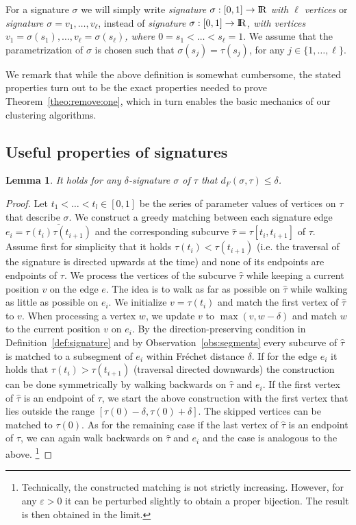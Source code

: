 \documentclass[11pt, letter]{article}
\newtheorem{lemma}[theorem]{Lemma}
\newcommand{\seclab}[1]{\label{sec:#1}}
\newcommand{\thmref}[1]{Theorem~\ref{theo:#1}}
\newcommand{\lemlab}[1]{\label{lemma:#1}}
\newcommand{\defref}[1]{Definition~\ref{def:#1}}
\newcommand{\obsref}[1]{Observation~\ref{obs:#1}}
\newcommand{\Frechet}{Fr\'echet\xspace}
\providecommand{\eps}{{\varepsilon}}\newcommand{\Astop}{\overline{a}}
\providecommand{\pth}[2][\!]{#1\left({#2}\right)}
\renewcommand{\Re}{{\rm I\!\hspace{-0.025em} R}}
\newcommand{\lenClusters}{\ensuremath{\ell}}
\newcommand{\distFr}[2]{\ensuremath{d_F\pth{#1,#2}}}
\begin{document}
For a signature $\sigma$ we will simply write \emph{signature $\sigma:[0,1]\rightarrow\Re$ with $\lenClusters$ vertices} or \emph{signature $\sigma=v_1,\ldots,v_\lenClusters$}, instead of \emph{signature $\sigma:[0,1]\rightarrow\Re$, with vertices $v_1=\sigma(s_1),\ldots,v_\lenClusters=\sigma(s_\lenClusters)$, where $0=s_1<\ldots<s_\lenClusters=1$}. We assume that the parametrization of $\sigma$ is chosen such that $\sigma(s_j)=\tau(s_j)$, for any $j\in\lbrace 1,\ldots,\lenClusters\rbrace$.

We remark that while the above definition is somewhat cumbersome, the stated
properties turn out to be the exact properties needed to prove
\thmref{remove:one}, which in turn enables the basic mechanics of our clustering
algorithms.

\subsection{Useful properties of signatures}
\seclab{properties:signatures}

\begin{lemma}\lemlab{fd:signature}
It holds for any $\delta$-signature $\sigma$ of $\tau$ that $\distFr{\sigma}{\tau}\leq \delta$.
\end{lemma}


\begin{proof}
Let $t_1<\dots<t_l \in [0,1]$ be the series of parameter values of vertices on $\tau$ that describe $\sigma$. We construct a greedy matching between each signature edge $e_i=\overline{\tau(t_i)\tau(t_{i+1})}$ and the corresponding subcurve $\widehat{\tau}=\tau[t_i,t_{i+1}]$ of $\tau$. Assume first for simplicity that it holds $\tau(t_i)<\tau(t_{i+1})$ (i.e. the traversal of the signature is directed upwards at the time) and none of its endpoints are endpoints of $\tau$. We process the vertices of the subcurve $\widehat{\tau}$ while keeping a current position $v$ on the edge $e$. The idea is to walk as far as possible on $\widehat{\tau}$ while walking as little as possible on $e_i$. We initialize $v=\tau(t_i)$ and match the first vertex of $\widehat{\tau}$ to $v$. When processing a vertex $w$, we update $v$ to $\max(v,w-\delta)$ and match $w$ to the current position $v$ on $e_i$. By the direction-preserving condition in \defref{signature} and by \obsref{segments} every subcurve of $\widehat{\tau}$ is matched to a subsegment of $e_i$ within \Frechet distance $\delta$. If for the edge $e_i$ it holds that $\tau(t_i)>\tau(t_{i+1})$ (traversal directed downwards) the construction can be done symmetrically by walking backwards on $\widehat{\tau}$ and $e_i$. If the first vertex of $\widehat{\tau}$ is an endpoint of $\tau$, we start the above construction with the first vertex that lies outside the range $[\tau(0)-\delta,\tau(0)+\delta]$. The skipped vertices can be matched to $\tau(0)$. As for the remaining case if the last vertex of $\widehat{\tau}$ is an endpoint of $\tau$, we can again walk backwards on $\widehat{\tau}$ and $e_i$ and the case is analogous to the above.
\footnote{
Technically, the constructed matching is not strictly increasing. However, for any $\eps>0$ it can be perturbed slightly to obtain a proper bijection. The result is then obtained in the limit.
}
\end{proof}
\end{document}
